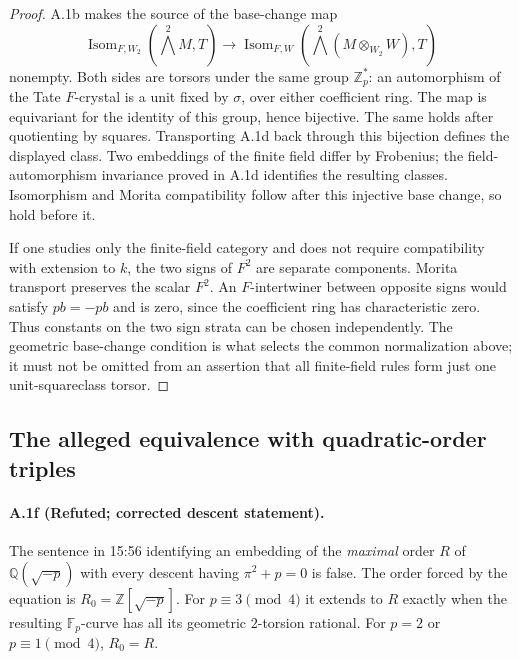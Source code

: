 \begin{proof}
A.1b makes the source of the base-change map
\[
 \operatorname{Isom}_{F,W_2}(\bigwedge^2M,T)
 \longrightarrow
 \operatorname{Isom}_{F,W}(\bigwedge^2(M\otimes_{W_2}W),T)
\]
nonempty. Both sides are torsors under the same group $\mathbb Z_p^*$:
an automorphism of the Tate $F$-crystal is a unit fixed by $\sigma$,
over either coefficient ring. The map is equivariant for the identity
of this group, hence bijective. The same holds after quotienting by
squares. Transporting A.1d back through this bijection defines the
displayed class. Two embeddings of the finite field differ by
Frobenius; the field-automorphism invariance proved in A.1d identifies
the resulting classes. Isomorphism and Morita compatibility follow
after this injective base change, so hold before it.

If one studies only the finite-field category and does not require
compatibility with extension to $k$, the two signs of $F^2$ are
separate components. Morita transport preserves the scalar $F^2$.
An $F$-intertwiner between opposite signs would satisfy $pb=-pb$
and is zero, since the coefficient ring has characteristic zero.
Thus constants on the two sign strata can be chosen independently.
The geometric base-change condition is what selects the common
normalization above; it must not be omitted from an assertion that
all finite-field rules form just one unit-squareclass torsor.
\end{proof}

\subsection{The alleged equivalence with quadratic-order triples}

\paragraph{A.1f (Refuted; corrected descent statement).}
The sentence in 15:56 identifying an embedding of the \emph{maximal}
order $R$ of $\mathbb Q(\sqrt{-p})$ with every descent having
$\pi^2+p=0$ is false. The order forced by the equation is
$R_0=\mathbb Z[\sqrt{-p}]$. For $p\equiv3\pmod4$ it extends to $R$
exactly when the resulting $\mathbb F_p$-curve has all its geometric
$2$-torsion rational. For $p=2$ or $p\equiv1\pmod4$, $R_0=R$.

